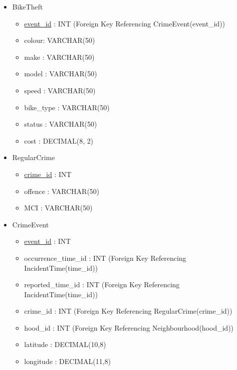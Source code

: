 \documentclass[12pt, a4paper]{article}
\begin{document}
\begin{itemize}
    \item BikeTheft
        \begin{itemize}
        \item \underline{event\_id} :  \color{blue} INT \color{black} (Foreign Key Referencing CrimeEvent(event\_id))
        \item colour: \color{blue} VARCHAR(50) \color{black}
        \item make : \color{blue} VARCHAR(50) \color{black}
        \item model : \color{blue}  VARCHAR(50) \color{black}
        \item speed : \color{blue} VARCHAR(50) \color{black}
        \item bike\_type : \color{blue} VARCHAR(50) \color{black}
        \item status : \color{blue} VARCHAR(50) \color{black}
        \item cost : \color{blue} DECIMAL(8, 2) \color{black}
    \end{itemize}
    \item RegularCrime
        \begin{itemize}
        \item \underline{crime\_id} : \color{blue} INT \color{black}
        \item offence : \color{blue} VARCHAR(50) \color{black}
        \item MCI : \color{blue} VARCHAR(50) \color{black}
    \end{itemize}
    \item CrimeEvent
        \begin{itemize}
        \item \underline{event\_id} :  \color{blue} INT \color{black}
        \item occurrence\_time\_id :  \color{blue} INT \color{black} (Foreign Key Referencing IncidentTime(time\_id))
        \item reported\_time\_id : \color{blue} INT \color{black} (Foreign Key Referencing IncidentTime(time\_id))
        \item crime\_id : \color{blue} INT \color{black} (Foreign Key Referencing RegularCrime(crime\_id))
        \item hood\_id : \color{blue} INT \color{black} (Foreign Key Referencing Neighbourhood(hood\_id))
        \item latitude : \color{blue} DECIMAL(10,8) \color{black}
        \item longitude : \color{blue} DECIMAL(11,8) \color{black}

\end{itemize}
\end{itemize}
\end{document}

